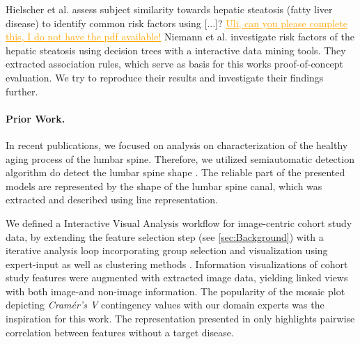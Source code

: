 \documentclass[journal]{style/vgtc} 			          %
\newcommand{\com}[1]{\textcolor{orange}{\uline{#1}}}
\begin{document}
Hielscher et al. \cite{Hielscher} assess subject similarity towards hepatic steatosis (fatty liver disease) to identify common risk factors using [...]?
\com{Uli, can you please complete this, I do not have the pdf available!}
Niemann et al. \cite{Niemann2014} investigate risk factors of the hepatic steatosis using decision trees with a interactive data mining tools.
They extracted association rules, which serve as basis for this works proof-of-concept evaluation.
We try to reproduce their results and investigate their findings further.

\paragraph{Prior Work.}
In recent publications, we focused on analysis on characterization of the healthy aging process of the lumbar spine.
Therefore, we utilized semiautomatic detection algorithm do detect the lumbar spine shape \cite{Klemm2013VMV}.
The reliable part of the presented models are represented by the shape of the lumbar spine canal, which was extracted and described using line representation.

We defined a Interactive Visual Analysis workflow for image-centric cohort study data, by extending the feature selection step (see \ref{sec:Background}) with a iterative analysis loop incorporating group selection and visualization using expert-input as well as clustering methods \cite{Klemm2014VIS}.
Information visualizations of cohort study features were augmented with extracted image data, yielding linked views with both image-and non-image information.
The popularity of the mosaic plot depicting \emph{Cram\'{e}r's V} contingency values with our domain experts was the inspiration for this work.
The representation presented in \cite{Klemm2014VIS} only highlights pairwise correlation between features without a target disease.
\end{document}
